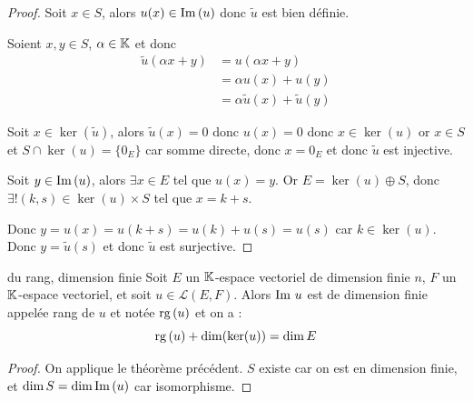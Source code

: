 \begin{proof}
    Soit $x \in S$, alors $u(x) \in \operatorname{Im} \, (u)$ donc $\tilde u$ est bien définie.

    Soient $x, y \in S$, $\alpha \in \mathbb{K}$ et donc 
    \begin{align}
        \tilde u (\alpha x + y) & = u(\alpha x + y) \\
        & = \alpha u(x) + u(y) \\
        & = \alpha \tilde u (x) + \tilde u (y)
    \end{align}

    Soit $x \in \ker (\tilde u)$, alors $\tilde u(x) = 0$ donc $u(x) = 0$ 
    donc $x \in \ker (u) $ or $x \in S$ et $S \cap \ker (u) = \{0_E\}$ car 
    somme directe, donc $x = 0_E$ et donc $\tilde u$ est injective.

    \lvspace Soit $y \in \operatorname{Im} \, (u)$, alors $\exists x \in E$ tel que $u(x) = y$.
    Or $E = \ker (u) \oplus S$, donc $\exists ! (k, s) \in \ker (u) \times S$ tel que
    $x = k + s$. 

    Donc $y = u(x) = u(k + s) = u(k) + u(s) = u(s)$ car $k \in \ker (u)$.
    Donc $y = \tilde u (s)$ et donc $\tilde u$ est surjective.
\end{proof}

\begin{theoreme}{du rang, dimension finie}{}
    Soit $E$ un $\mathbb{K}$-espace vectoriel de dimension finie $n$, $F$ un $\mathbb{K}$-espace vectoriel, 
    et soit $u \in \mathscr L(E, F)$. Alors $\operatorname{Im} \, u $ est de dimension finie appelée 
    rang de $u$ et notée $\operatorname{rg} \,(u)$ et on a :
    \[
        \operatorname{rg} \,(u) + \dim(\ker(u)) = \dim E
    \]
\end{theoreme}


\begin{proof}
    On applique le théorème précédent. $S$ existe car on est en dimension finie,
    et $\dim S = \dim \operatorname{Im} \, (u)$ car isomorphisme.
\end{proof}

